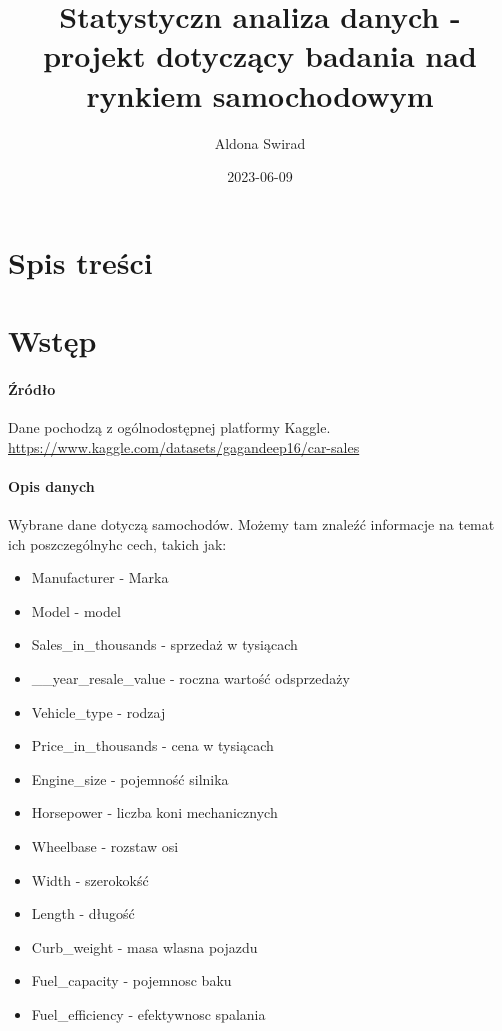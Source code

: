 \documentclass[
]{article}
\title{Statystyczn analiza danych - projekt dotyczący badania nad
rynkiem samochodowym}
\author{Aldona Swirad}
\date{2023-06-09}
\providecommand{\tightlist}{%
  \setlength{\itemsep}{0pt}\setlength{\parskip}{0pt}}
\begin{document}
\maketitle

\hypertarget{spis-treux15bci}{%
\section{Spis treści}\label{spis-treux15bci}}

\hypertarget{wstux119p}{%
\section{Wstęp}\label{wstux119p}}

\hypertarget{ux17aruxf3dux142o}{%
\paragraph{Źródło}\label{ux17aruxf3dux142o}}

Dane pochodzą z ogólnodostępnej platformy Kaggle.
\url{https://www.kaggle.com/datasets/gagandeep16/car-sales}

\hypertarget{opis-danych}{%
\paragraph{Opis danych}\label{opis-danych}}

Wybrane dane dotyczą samochodów. Możemy tam znaleźć informacje na temat
ich poszczególnyhc cech, takich jak:

\begin{itemize}
\tightlist
\item
  Manufacturer - Marka
\item
  Model - model
\item
  Sales\_in\_thousands - sprzedaż w tysiącach
\item
  \_\_year\_resale\_value - roczna wartość odsprzedaży
\item
  Vehicle\_type - rodzaj
\item
  Price\_in\_thousands - cena w tysiącach
\item
  Engine\_size - pojemność silnika
\item
  Horsepower - liczba koni mechanicznych
\item
  Wheelbase - rozstaw osi
\item
  Width - szerokokść
\item
  Length - długość
\item
  Curb\_weight - masa wlasna pojazdu
\item
  Fuel\_capacity - pojemnosc baku
\item
  Fuel\_efficiency - efektywnosc spalania
\end{itemize}
\end{document}
